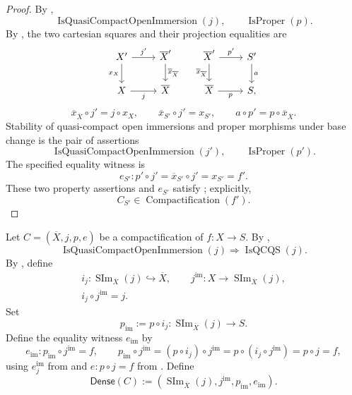 \begin{proof}
  By ,
  \[
    \operatorname{IsQuasiCompactOpenImmersion}(j),
    \qquad
    \operatorname{IsProper}(p).
  \]
  By , the two cartesian
  squares and their projection equalities are
  \[
  \begin{tikzcd}
    X' \arrow[r,"j'"] \arrow[d,"x_X"'] &
      \overline X' \arrow[d,"\overline x_{\overline X}"] &
    \overline X' \arrow[r,"p'"] \arrow[d,"\overline x_{\overline X}"'] &
      S' \arrow[d,"a"]\\
    X \arrow[r,"j"'] & \overline X &
    \overline X \arrow[r,"p"'] & S,
  \end{tikzcd}
  \]
  \[
    \overline x_{\overline X}\circ j'=j\circ x_X,
    \qquad
    \overline x_{S'}\circ j'=x_{S'},
    \qquad
    a\circ p'=p\circ\overline x_{\overline X}.
  \]
  Stability of quasi-compact open immersions and proper morphisms under base
  change is the pair of assertions
  \[
    \operatorname{IsQuasiCompactOpenImmersion}(j'),
    \qquad
    \operatorname{IsProper}(p').
  \]
  The specified equality witness is
  \[
    e_{S'}\colon p'\circ j'
      =\overline x_{S'}\circ j'
      =x_{S'}=f'.
  \]
  These two property assertions and $e_{S'}$ satisfy
  ; explicitly,
  \[
    C_{S'}\in\operatorname{Compactification}(f').
  \]
\end{proof}

\begin{definition}
  \label{def:nagata-dense-refinement}
  \lean{}

  Let $C=(\overline X,j,p,e)$ be a compactification of $f\colon X\to S$.
  By ,
  \[
    \operatorname{IsQuasiCompactOpenImmersion}(j)
      \Longrightarrow\operatorname{IsQCQS}(j).                  \tag{DR-1}
  \]
  By
  ,
  define
  \[
  \begin{gathered}
    i_j\colon\operatorname{SIm}_{\overline X}(j)\hookrightarrow\overline X,
    \qquad
    j^{\mathrm{im}}\colon X\to\operatorname{SIm}_{\overline X}(j),\\
    i_j\circ j^{\mathrm{im}}=j.
  \end{gathered}                                                     \tag{DR-2}
  \]
  Set
  \[
    p_{\mathrm{im}}:=p\circ i_j
      \colon\operatorname{SIm}_{\overline X}(j)\to S.
  \]
  Define the equality witness $e_{\mathrm{im}}$ by
  \[
    e_{\mathrm{im}}\colon p_{\mathrm{im}}\circ j^{\mathrm{im}}=f,
    \qquad
    p_{\mathrm{im}}\circ j^{\mathrm{im}}
      =(p\circ i_j)\circ j^{\mathrm{im}}
      =p\circ(i_j\circ j^{\mathrm{im}})
      =p\circ j=f,
  \]
  using $e_j^{\mathrm{im}}$ from
   and $e\colon p\circ j=f$ from
  .  Define
  \[
    \mathsf{Dense}(C):=
      \left(\operatorname{SIm}_{\overline X}(j),
        j^{\mathrm{im}},p_{\mathrm{im}},e_{\mathrm{im}}\right).
  \]
\end{definition}

